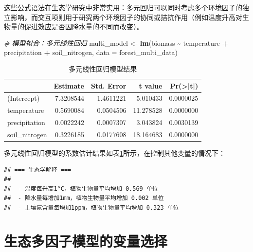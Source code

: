 \documentclass[
  twoside,12pt,fontset=none]{ctexbook}
\newenvironment{Shaded}{\begin{snugshade}}{\end{snugshade}}
\newcommand{\AttributeTok}[1]{\textcolor[rgb]{0.13,0.29,0.53}{#1}}
\newcommand{\CommentTok}[1]{\textcolor[rgb]{0.56,0.35,0.01}{\textit{#1}}}
\newcommand{\FunctionTok}[1]{\textcolor[rgb]{0.13,0.29,0.53}{\textbf{#1}}}
\newcommand{\NormalTok}[1]{#1}
\newcommand{\OtherTok}[1]{\textcolor[rgb]{0.56,0.35,0.01}{#1}}
\newcommand{\SpecialCharTok}[1]{\textcolor[rgb]{0.81,0.36,0.00}{\textbf{#1}}}
\begin{document}
这些公式语法在生态学研究中非常实用：多元回归可以同时考虑多个环境因子的独立影响，而交互项则用于研究两个环境因子的协同或拮抗作用（例如温度升高对生物量的促进效应是否因降水量的不同而改变）。

\begin{Shaded}
\begin{Highlighting}[]
\CommentTok{\# 模型拟合：多元线性回归}
\NormalTok{multi\_model }\OtherTok{\textless{}{-}} \FunctionTok{lm}\NormalTok{(biomass }\SpecialCharTok{\textasciitilde{}}\NormalTok{ temperature }\SpecialCharTok{+}\NormalTok{ precipitation }\SpecialCharTok{+}\NormalTok{ soil\_nitrogen,}
                  \AttributeTok{data =}\NormalTok{ forest\_multi\_data)}
\end{Highlighting}
\end{Shaded}

\begin{table}[!h]
\centering
\caption{\label{tab:multi-regression-results}多元线性回归模型结果}
\centering
\begin{tabular}[t]{lrrrr}
\toprule
  & Estimate & Std. Error & t value & Pr(>|t|)\\
\midrule
(Intercept) & 7.3208544 & 1.4611221 & 5.010433 & 0.0000025\\
temperature & 0.5690084 & 0.0504506 & 11.278528 & 0.0000000\\
precipitation & 0.0022242 & 0.0007307 & 3.043824 & 0.0030139\\
soil\_nitrogen & 0.3226185 & 0.0177608 & 18.164683 & 0.0000000\\
\bottomrule
\end{tabular}
\end{table}

多元线性回归模型的系数估计结果如表\ref{tab:multi-regression-results}所示，在控制其他变量的情况下：

\begin{verbatim}
## === 生态学解释 ===
## 
##  - 温度每升高1°C，植物生物量平均增加 0.569 单位
##  - 降水量每增加1mm，植物生物量平均增加 0.002 单位
##  - 土壤氮含量每增加1ppm，植物生物量平均增加 0.323 单位
\end{verbatim}

\hypertarget{ux751fux6001ux591aux56e0ux5b50ux6a21ux578bux7684ux53d8ux91cfux9009ux62e9}{%
\section{生态多因子模型的变量选择}\label{ux751fux6001ux591aux56e0ux5b50ux6a21ux578bux7684ux53d8ux91cfux9009ux62e9}}
\end{document}
